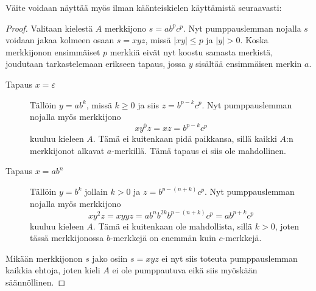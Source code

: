 \documentclass[a4paper,11pt]{article}
\begin{document}
\begin{enumerate}
\begin{enumerate}
    Väite voidaan näyttää myös ilman käänteiskielen käyttämistä seuraavasti:

    \begin{proof}
            Valitaan kielestä $A$ merkkijono $s = ab^pc^p$. Nyt pumppauslemman nojalla
            $s$ voidaan jakaa kolmeen osaan $s = xyz$, missä $|xy| \leq p$ ja $|y| >
            0$. Koska merkkijonon ensimmäiset $p$ merkkiä eivät nyt koostu samasta
            merkistä, joudutaan tarkastelemaan erikseen tapaus, jossa $y$ sisältää
            ensimmäisen merkin $a$.
        
            \begin{description}
                \item[Tapaus $x = \varepsilon$] \hfill\newline
                    Tällöin $y = ab^k$, missä $k \geq 0$ ja siis $z = b^{p-k}c^p$. Nyt
                    pumppauslemman nojalla myös merkkijono
                    \begin{equation*}
                        xy^0z = xz = b^{p-k}c^p
                    \end{equation*}
                    kuuluu kieleen $A$. Tämä ei kuitenkaan pidä paikkansa, sillä kaikki
                    $A$:n merkkijonot alkavat $a$-merkillä. Tämä tapaus ei siis ole
                    mahdollinen.
        
                \item[Tapaus $x = ab^n$]
                    Tällöin $y = b^k$ jollain $k > 0$ ja $z = b^{p-(n+k)}c^p$.
                    Nyt pumppauslemman nojalla myös merkkijono
                    \begin{equation*}
                        xy^2z = xyyz = ab^nb^{2k}b^{p-(n+k)}c^p = ab^{p+k}c^p
                    \end{equation*}
                    kuuluu kieleen $A$. Tämä ei kuitenkaan ole mahdollista, sillä $k >
                    0$, joten tässä merkkijonossa  $b$-merkkejä on enemmän kuin
                    $c$-merkkejä.
            \end{description}
        
            Mikään merkkijonon $s$ jako osiin $s = xyz$ ei nyt siis toteuta
            pumppauslemman kaikkia ehtoja, joten kieli $A$ ei ole pumppautuva eikä siis
            myöskään säännöllinen.
    \end{proof}


\end{enumerate}
\end{enumerate}
\end{document}

